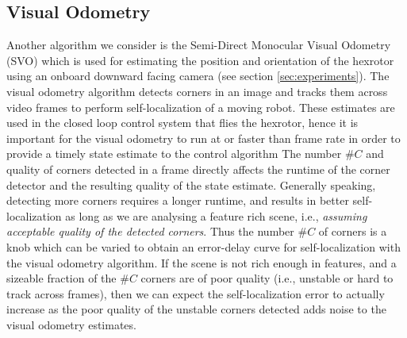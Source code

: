 \subsection{Visual Odometry} \label{sec:visual_odometry}

Another algorithm we consider is the Semi-Direct Monocular Visual Odometry (SVO)\cite{forster2014svo} which is used for estimating the position and orientation of the hexrotor using an onboard downward facing camera (see section \ref{sec:experiments}).
The visual odometry algorithm detects corners in an image and tracks them across video frames to perform self-localization of a moving robot.
These estimates are used in the closed loop control system that flies the hexrotor, hence it is important for the visual odometry to run at or faster than frame rate in order to provide a timely state estimate to the control algorithm
The number $\#C$ and quality of corners detected in a frame directly affects the runtime of the corner detector and the resulting quality of the state estimate. Generally speaking, detecting more corners requires a longer runtime, and results in better self-localization as long as we are analysing a feature rich scene, i.e., \emph{assuming acceptable quality of the detected corners}. Thus the number $\#C$ of corners is a knob which can be varied to obtain an error-delay curve for self-localization with the visual odometry algorithm.
If the scene is not rich enough in features, and a sizeable fraction of the $\#C$ corners are of poor quality (i.e., unstable or hard to track across frames), then we can expect the self-localization error to actually increase as the poor quality of the unstable corners detected adds noise to the visual odometry estimates.

